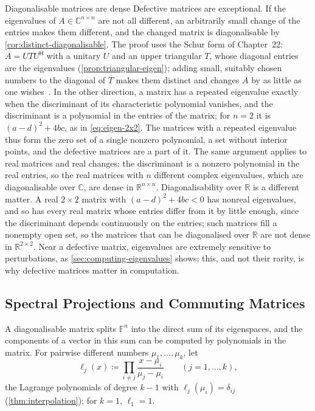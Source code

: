 \begin{note}{Diagonalisable matrices are dense}
Defective matrices are exceptional. If the eigenvalues of $A\in\mathbb C^{n\times n}$ are not all different, an arbitrarily small change of the entries makes them different, and the changed matrix is diagonalisable by \cref{cor:distinct-diagonalisable}. The proof uses the Schur form of Chapter~22: $A=UTU^{\mathsf H}$ with a unitary $U$ and an upper triangular $T$, whose diagonal entries are the eigenvalues (\cref{prop:triangular-eigen}); adding small, suitably chosen numbers to the diagonal of $T$ makes them distinct and changes $A$ by as little as one wishes~\cite[Sect.~2.4]{horn2013}. In the other direction, a matrix has a repeated eigenvalue exactly when the discriminant of its characteristic polynomial vanishes, and the discriminant is a polynomial in the entries of the matrix; for $n=2$ it is $(a-d)^2+4bc$, as in \eqref{eq:eigen-2x2}. The matrices with a repeated eigenvalue thus form the zero set of a single nonzero polynomial, a set without interior points, and the defective matrices are a part of it. The same argument applies to real matrices and real changes: the discriminant is a nonzero polynomial in the real entries, so the real matrices with $n$ different complex eigenvalues, which are diagonalisable over $\mathbb C$, are dense in $\mathbb R^{n\times n}$. Diagonalisability over $\mathbb R$ is a different matter. A real $2\times2$ matrix with $(a-d)^2+4bc<0$ has nonreal eigenvalues, and so has every real matrix whose entries differ from it by little enough, since the discriminant depends continuously on the entries; such matrices fill a nonempty open set, so the matrices that can be diagonalised over $\mathbb R$ are not dense in $\mathbb R^{2\times2}$. Near a defective matrix, eigenvalues are extremely sensitive to perturbations, as \cref{sec:computing-eigenvalues} shows; this, and not their rarity, is why defective matrices matter in computation.
\end{note}

\subsection{Spectral Projections and Commuting Matrices}

A diagonalisable matrix splits $\mathbb F^n$ into the direct sum of its eigenspaces, and the components of a vector in this sum can be computed by polynomials in the matrix. For pairwise different numbers $\mu_1,\ldots,\mu_k$, let
\begin{equation}
\ell_j(x)\coloneqq\prod_{i\ne j}\frac{x-\mu_i}{\mu_j-\mu_i}\qquad(j=1,\ldots,k),
\label{eq:lagrange-basis}
\end{equation}
the Lagrange polynomials of degree $k-1$ with $\ell_j(\mu_i)=\delta_{ij}$ (\cref{thm:interpolation}); for $k=1$, $\ell_1=1$.


